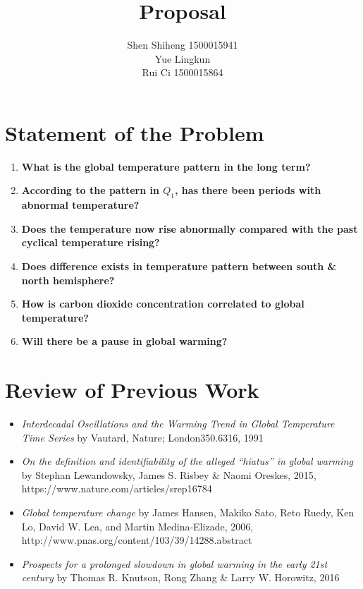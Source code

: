 \documentclass[10pt,a4paper]{article}
\author{Shen Shiheng 1500015941 \\ Yue Lingkun \\ Rui Ci 1500015864}
\title{\textbf{Proposal}}
\begin{document}
\maketitle

\section{Statement of the Problem}
\begin{enumerate}
	\item \textbf{What is the global temperature pattern in the long term?}
	\item \textbf{According to the pattern in $Q_1$, has there been periods with abnormal temperature?}
	\item \textbf{Does the temperature now rise abnormally compared with the past cyclical temperature rising?}  
	\item \textbf{Does difference exists in temperature pattern between south \& north hemisphere?}
	\item \textbf{How is carbon dioxide concentration correlated to global temperature?} 
	\item \textbf{Will there be a pause in global warming?} 
\end{enumerate}

\section{Review of Previous Work}
\begin{itemize}
	\item \textit{Interdecadal Oscillations and the Warming Trend in Global Temperature Time Series} by Vautard, Nature; London350.6316, 1991 
	\item \textit{On the definition and identifiability of the alleged “hiatus” in global warming} by Stephan Lewandowsky, James S. Risbey \& Naomi Oreskes, 2015, https://www.nature.com/articles/srep16784 
	\item \textit{Global temperature change} by James Hansen, Makiko Sato, Reto Ruedy, Ken Lo, David W. Lea, and Martin Medina-Elizade, 2006, http://www.pnas.org/content/103/39/14288.abstract 
	\item \textit{Prospects for a prolonged slowdown in global warming in the early 21st century} by Thomas R. Knutson, Rong Zhang \& Larry W. Horowitz, 2016
\end{itemize}
\end{document}
